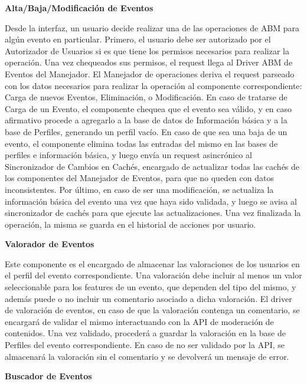 \textbf{Alta/Baja/Modificación de Eventos}

Desde la interfaz, un usuario decide realizar una de las operaciones de ABM para algún evento en particular. Primero, el usuario debe ser autorizado por el Autorizador de Usuarios si es que tiene los permisos necesarios para realizar la operación. Una vez chequeados sus permisos, el request llega al Driver ABM de Eventos del Manejador. El Manejador de operaciones deriva el request parseado con los datos necesarios para realizar la operación al componente correspondiente: Carga de nuevos Eventos, Eliminación, o Modificación.
En caso de tratarse de Carga de un Evento, el componente chequea que el evento sea válido, y en caso afirmativo procede a agregarlo a la base de datos de Información básica y a la base de Perfiles, generando un perfil vacío.
En caso de que sea una baja de un evento, el componente elimina todas las entradas del mismo en las bases de perfiles e información básica, y luego envía un request asincrónico al Sincronizador de Cambios en Cachés, encargado de actualizar todas las cachés de los componentes del Manejador de Eventos, para que no queden con datos inconsistentes.
Por último, en caso de ser una modificación, se actualiza la información básica del evento una vez que haya sido validada, y luego se avisa al sincronizador de cachés para que ejecute las actualizaciones.
Una vez finalizada la operación, la misma se guarda en el historial de acciones por usuario.

\textbf{Valorador de Eventos}

Este componente es el encargado de almacenar las valoraciones de los usuarios en el perfil del evento correspondiente. Una valoración debe incluir al menos un valor seleccionable para los features de un evento, que dependen del tipo del mismo, y además puede o no incluir un comentario asociado a dicha valoración. El driver de valoración de eventos, en caso de que la valoración contenga un comentario, se encargará de validar el mismo interactuando con la API de moderación de contenidos. Una vez validado, procederá a guardar la valoración en la base de Perfiles del evento correspondiente. En caso de no ser validado por la API, se almacenará la valoración sin el comentario y se devolverá un mensaje de error.

\textbf{Buscador de Eventos}

